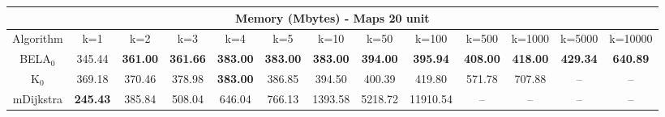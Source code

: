 \begin{tabular}{c|cccccccccccc}\toprule
\multicolumn{13}{c}{Memory (Mbytes) - Maps 20 unit}\\ \midrule
Algorithm & k=1 & k=2 & k=3 & k=4 & k=5 & k=10 & k=50 & k=100 & k=500 & k=1000 & k=5000 & k=10000 \\ \midrule
BELA$_0$ & 345.44 & \textbf{361.00} & \textbf{361.66} & \textbf{383.00} & \textbf{383.00} & \textbf{383.00} & \textbf{394.00} & \textbf{395.94} & \textbf{408.00} & \textbf{418.00} & \textbf{429.34} & \textbf{640.89} \\
K$_0$ & 369.18 & 370.46 & 378.98 & \textbf{383.00} & 386.85 & 394.50 & 400.39 & 419.80 & 571.78 & 707.88 & -- & -- \\
mDijkstra & \textbf{245.43} & 385.84 & 508.04 & 646.04 & 766.13 & 1393.58 & 5218.72 & 11910.54 & -- & -- & -- & -- \\ \bottomrule 
\end{tabular}
